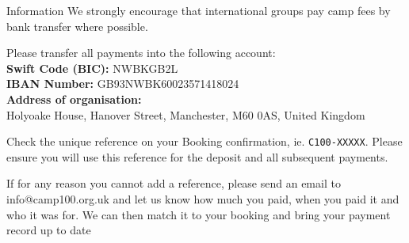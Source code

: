 \documentclass[a4paper, 11pt]{report}
\begin{document}
\begin{callout-green}{Information}
We strongly encourage that international groups pay camp fees by bank transfer where possible. 
\end{callout-green}

Please transfer all payments into the following account:\\
\textbf{Swift Code (BIC):} NWBKGB2L\\
\textbf{IBAN Number:} GB93NWBK60023571418024\\
\textbf{Address of organisation:} \\
Holyoake House, Hanover Street, Manchester, M60 0AS, United Kingdom

Check the unique reference on your Booking confirmation, ie. \verb|C100-XXXXX|. Please ensure you will use this reference for the deposit and all subsequent payments. 

If for any reason you cannot add a reference, please send an email to info@camp100.org.uk and let us know how much you paid, when you paid it and who it was for. We can then match it to your booking and bring your payment record up to date

\makedocumentbackpage
\end{document}
